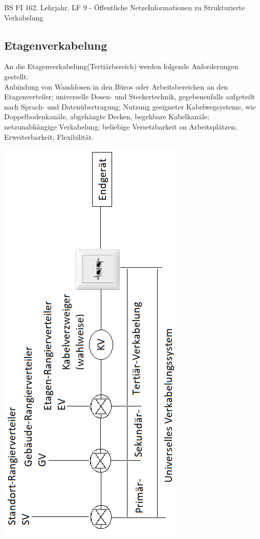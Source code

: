\documentclass[11pt,twocolumn,oneside,openany,headings=optiontotoc,11pt,numbers=noenddot]{article}
\begin{document}
\begin{worksheet}{BS FI 16}{2. Lehrjahr, LF 9 - Öffentliche Netze}{Informationen zu \glqq{}Strukturierte Verkabelung\grqq{}}
		\subsection*{Etagenverkabelung} An die Etagenverkabelung(Tertiärbereich) werden folgende Anforderungen gestellt:\\
		Anbindung von Wanddosen in den Büros oder Arbeitsbereichen an den Etagenverteiler; universelle Dosen- und Steckertechnik, gegebenenfalls aufgeteilt nach Sprach- und Datenübertragung; Nutzung geeigneter Kabelwegsysteme, wie Doppelbodenkanäle, abgehängte Decken, begehbare Kabelkanäle; netzunabhängige Verkabelung; beliebige Versetzbarkeit on Arbeitsplätzen; Erweiterbarkeit; Flexibilität.
		\newpage\noindent
		\begin{center}
			\includegraphics[scale=1.3]{Bilder/Kabellaenge1.png}
		\end{center}
		\newpage\noindent

\end{worksheet}
\end{document}
